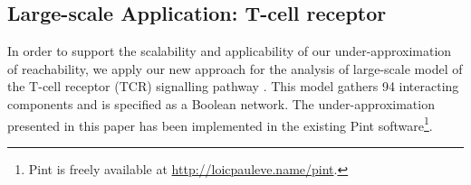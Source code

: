 \begin{table}[p]
%
  \caption{\label{tab:metazoan-ph-actions}%
    Sets of actions of the flattened metazoan segmentation model depicted
    in .
  }
\end{table}



\subsection{Large-scale Application: T-cell receptor}

In order to support the scalability and applicability of our under-approximation of reachability, we
apply our new approach for the analysis of large-scale model of the T-cell receptor (TCR)
signalling pathway \cite{tcrsig94}.
This model gathers 94 interacting components and is specified as a Boolean network.
The under-approximation presented in this paper has been implemented in the existing Pint
software\footnote{Pint is freely available at \url{http://loicpauleve.name/pint}.}.

